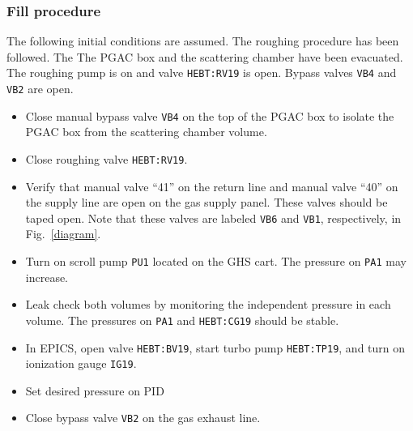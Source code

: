 \subsubsection{Fill procedure}
The following initial conditions are assumed. The roughing procedure has been followed. The The PGAC box and the scattering chamber have been evacuated. The roughing pump is on and valve \texttt{HEBT:RV19} is open. Bypass valves \texttt{VB4} and \texttt{VB2} are open. %
\begin{itemize}
\setlength{\itemsep}{0pt}
\setlength{\parskip}{0pt}
\setlength{\parsep}{0pt}
\item %
Close manual bypass valve \texttt{VB4} on the top of the PGAC box to isolate the PGAC box from the scattering chamber volume.
\item Close roughing valve \texttt{HEBT:RV19}.
\item Verify that manual valve ``41'' on the return line and manual valve  ``40'' on the supply line are open on the gas supply panel. These valves should be taped open.  Note that these valves are labeled \texttt{VB6} and \texttt{VB1}, respectively, in Fig.~\ref{diagram}.
\item Turn on scroll pump \texttt{PU1} located on the GHS cart. %
The pressure on \texttt{PA1} may increase.

\item Leak check both volumes by monitoring the independent pressure in each volume.  The pressures  on  \texttt{PA1} and \texttt{HEBT:CG19} should be stable.

\item In EPICS, open valve \texttt{HEBT:BV19},  start turbo pump \texttt{HEBT:TP19}, and turn on ionization gauge \texttt{IG19}.
\item Set desired pressure on PID

\item Close bypass valve \texttt{VB2} on the gas exhaust line. %


\end{itemize}
